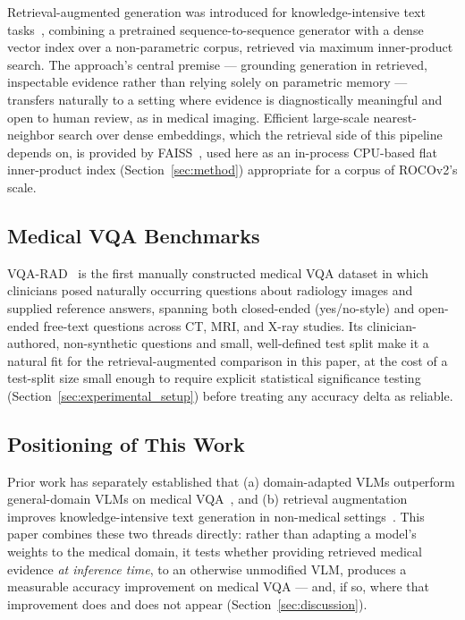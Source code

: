 Retrieval-augmented generation was introduced for knowledge-intensive
text tasks~\cite{lewis2020rag}, combining a pretrained sequence-to-sequence
generator with a dense vector index over a non-parametric corpus, retrieved
via maximum inner-product search. The approach's central premise ---
grounding generation in retrieved, inspectable evidence rather than relying
solely on parametric memory --- transfers naturally to a setting where
evidence is diagnostically meaningful and open to human review, as in
medical imaging. Efficient large-scale nearest-neighbor search over dense
embeddings, which the retrieval side of this pipeline depends on, is
provided by FAISS~\cite{johnson2019faiss}, used here as an in-process
CPU-based flat inner-product index (Section~\ref{sec:method}) appropriate
for a corpus of ROCOv2's scale.

\subsection{Medical VQA Benchmarks}

VQA-RAD~\cite{lau2018vqarad} is the first manually constructed medical VQA
dataset in which clinicians posed naturally occurring questions about
radiology images and supplied reference answers, spanning both closed-ended
(yes/no-style) and open-ended free-text questions across CT, MRI, and X-ray
studies. Its clinician-authored, non-synthetic questions and small,
well-defined test split make it a natural fit for the retrieval-augmented
comparison in this paper, at the cost of a test-split size small enough to
require explicit statistical significance testing
(Section~\ref{sec:experimental_setup}) before treating any accuracy delta
as reliable.

\subsection{Positioning of This Work}

Prior work has separately established that (a) domain-adapted VLMs
outperform general-domain VLMs on medical VQA~\cite{li2023llavamed}, and
(b) retrieval augmentation improves knowledge-intensive text generation in
non-medical settings~\cite{lewis2020rag}. This paper combines these two
threads directly: rather than adapting a model's weights to the medical
domain, it tests whether providing retrieved medical evidence \emph{at
inference time}, to an otherwise unmodified VLM, produces a measurable
accuracy improvement on medical VQA --- and, if so, where that improvement
does and does not appear (Section~\ref{sec:discussion}).

